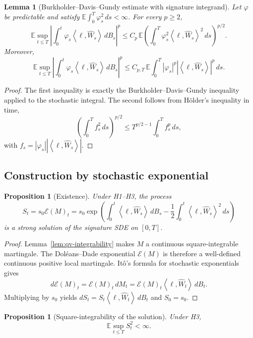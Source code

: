 \documentclass[11pt,oneside]{article}
\theoremstyle{plain}
\newtheorem{proposition}[theorem]{Proposition}
\newtheorem{lemma}[theorem]{Lemma}
\theoremstyle{definition}
\theoremstyle{remark}
\newcommand{\E}{\mathbb{E}}
\newcommand{\cW}{\widehat W}
\newcommand{\abs}[1]{\left\lvert #1\right\rvert}
\newcommand{\inner}[2]{\left\langle #1,#2\right\rangle}
\begin{document}
\begin{lemma}[Burkholder--Davis--Gundy estimate with signature integrand]\label{lem:bdg-signature}
Let $\varphi$ be predictable and satisfy $\E\int_0^T\varphi_s^2\,ds<\infty$. For every $p\geq2$,
\[
\E\sup_{t\leq T}\left|\int_0^t \varphi_s\inner{\ell}{\cW_s}\,dB_s\right|^p
\leq C_p\,\E\left(\int_0^T \varphi_s^2\inner{\ell}{\cW_s}^2\,ds\right)^{p/2}.
\]
Moreover,
\[
\E\sup_{t\leq T}\left|\int_0^t \varphi_s\inner{\ell}{\cW_s}\,dB_s\right|^p
\leq C_{p,T}\,\E\int_0^T \abs{\varphi_s}^{p}\abs{\inner{\ell}{\cW_s}}^{p}\,ds.
\]
\end{lemma}

\begin{proof}
The first inequality is exactly the Burkholder--Davis--Gundy inequality applied to the stochastic integral. The second follows from H\"older's inequality in time,
\[
\left(\int_0^T f_s^2\,ds\right)^{p/2}\leq T^{p/2-1}\int_0^T f_s^p\,ds,
\]
with $f_s=\abs{\varphi_s}\abs{\inner{\ell}{\cW_s}}$.
\end{proof}

\subsection{Construction by stochastic exponential}\label{subsec:exponential-construction}

\begin{proposition}[Existence]\label{prop:existence}
Under H1--H3, the process
\[
S_t=s_0\mathcal E(M)_t
=s_0\exp\left(\int_0^t\inner{\ell}{\cW_s}\,dB_s-\frac{1}{2}\int_0^t\inner{\ell}{\cW_s}^2\,ds\right)
\]
is a strong solution of the signature SDE on $[0,T]$.
\end{proposition}

\begin{proof}
Lemma~\ref{lem:qv-integrability} makes $M$ a continuous square-integrable martingale. The Dol\'eans--Dade exponential $\mathcal E(M)$ is therefore a well-defined continuous positive local martingale. It\^o's formula for stochastic exponentials gives
\[
d\mathcal E(M)_t=\mathcal E(M)_t\,dM_t=\mathcal E(M)_t\inner{\ell}{\cW_t}\,dB_t.
\]
Multiplying by $s_0$ yields $dS_t=S_t\inner{\ell}{\cW_t}\,dB_t$ and $S_0=s_0$.
\end{proof}

\begin{proposition}[Square-integrability of the solution]\label{prop:square-integrability}
Under H3,
\[
\E\sup_{t\leq T}S_t^2<\infty.
\]
\end{proposition}
\end{document}
